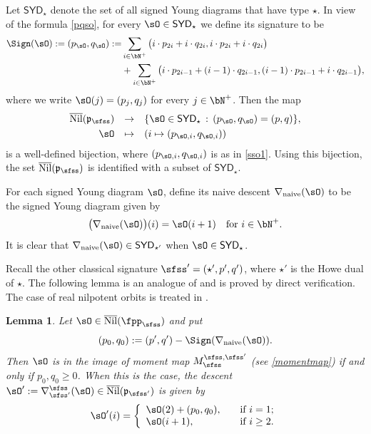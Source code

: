 \documentclass[11pt,a4paper]{amsart}
\def\SYD{{\mathsf{SYD}}}
\newcommand{\p}{\mathfrak p}
\def\DD{\nabla}
\newcommand{\be}{\begin {equation}}
\newcommand{\ee}{\end {equation}}
\numberwithin{equation}{section}
\newtheorem{lem}[thm]{Lemma}
\theoremstyle{remark}
\def\Nil{\overline{\mathrm{Nil}}}
\def\DDn{\DD_{\mathrm{naive}}}
\def\SYD{{\mathsf{SYD}}}
\begin{document}
Let $\SYD_{\star}$ denote the set of all signed Young diagrams that have type $\star$.
In view of the formula \eqref{pqso}, for every $\sO\in \SYD_{\star}$ we define its signature to be
\be\label{signso}
  \begin{split}
    \Sign(\sO) :=(p_\sO,q_\sO):= &
    \sum_{i\in \bN^{+}} \big(i \cdot p_{2i} + i \cdot q_{2i},
    i \cdot p_{2i}+i\cdot q_{2i}\big)\\
    &  +
    \sum_{i\in \bN^{+}} \big(i \cdot p_{2i-1} + (i-1)\cdot q_{2i-1},
    (i-1) \cdot p_{2i-1}+i \cdot q_{2i-1}\big),
  \end{split}
\ee
where we write $\sO(j)=( p_{j},q_{j})$ for every $j\in \bN^+$.
Then the map
\begin{equation}\label{SYDO}
  \begin{array}{rcl}
  \Nil(\p_{\sfss})&\rightarrow& \{\sO\in \SYD_\star\,:\, (p_\sO, q_\sO)=(p,q)\}, \smallskip\\
  \sO&\mapsto& \left(i\mapsto (p_{\sO,i}, q_{\sO,i})\right)
  \end{array}
\end{equation}
is a well-defined bijection, where $(p_{\sO,i}, q_{\sO,i})$ is as in \eqref{sso1}.
 Using this bijection, the set $\Nil(\p_{\sfss})$ is  identified with a subset of $\SYD_\star$.

For each signed Young diagram
$\sO$, define its naive descent $\DDn(\sO)$ to be the signed Young diagram given by
\be\label{naivedso}
\big(\DDn(\sO)\big)(i) = \sO(i+1) \quad \text{for } i \in \bN^+.
\ee
It is clear that $\DDn(\sO)\in
\SYD_{\star'}$ when $\sO\in
\SYD_{\star}$.

Recall the other classical signature $\sfss'=(\star', p',q')$, where  $\star'$ is the Howe dual of $\star$.
The following lemma is an analogue of  and is proved by direct verification. The case of real nilpotent orbits is treated in \cite[Section 3.2]{Zh}.

\begin{lem}\label{prop:DDss}
Let  $\sO\in \Nil(\fpps)$ and put
\begin{equation}\label{eq:DDss1}
  (p_0,q_0):= (p',q') - \Sign(\DDn(\sO)).
\end{equation}
Then $\sO$
is in the
image of moment map $M_\sfss^{\sfss, \sfss'}$ (see \eqref{momentmap}) if and only if $p_0,q_0\geq 0$.
When this is the case,   the descent $\sO' := \DDss(\sO)\in \Nil(\p_{\sfss'})$
is given  by
\[
\sO'(i)=
\left\{\begin{array}{ll}
  \sO(2)+(p_0,q_0),\quad& \textrm{if $i=1$};\\
  \sO(i+1),\quad& \textrm{if $i\geq 2$}.
  \end{array}
  \right.
  \]
\end{lem}
\end{document}
